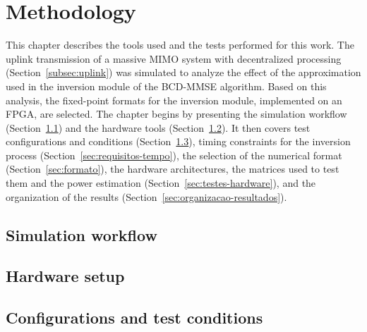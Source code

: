 \chapter{Methodology}\label{chap:metodologia}
This chapter describes the tools used and the tests performed for this work. The uplink transmission of a massive MIMO system with decentralized processing (Section~\ref{subsec:uplink}) was simulated to analyze the effect of the approximation used in the inversion module of the BCD-MMSE algorithm. Based on this analysis, the fixed-point formats for the inversion module, implemented on an FPGA, are selected. The chapter begins by presenting the simulation workflow (Section~\ref{sec:simulador}) and the hardware tools (Section~\ref{sec:setup-hardware}). It then covers test configurations and conditions (Section~\ref{sec:configuracoes}), timing constraints for the inversion process (Section~\ref{sec:requisitos-tempo}), the selection of the numerical format (Section~\ref{sec:formato}), the hardware architectures, the matrices used to test them and the power estimation (Section~\ref{sec:testes-hardware}), and the organization of the results (Section~\ref{sec:organizacao-resultados}).



\section{\texorpdfstring{Simulation workflow}{Simulation workflow}}\label{sec:simulador}


\section{\texorpdfstring{Hardware setup}{Hardware setup}}\label{sec:setup-hardware}


\section{\texorpdfstring{Configurations and test conditions}{Configurations and test conditions}}\label{sec:configuracoes}
